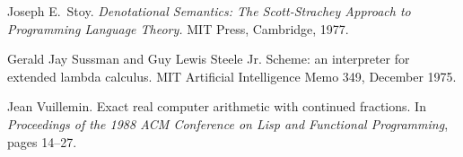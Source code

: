 \begin{thebibliography}{99}
Joseph E.~Stoy.
{\em Denotational Semantics: The Scott-Strachey Approach to
  Programming Language Theory.}
MIT Press, Cambridge, 1977.

Gerald Jay Sussman and Guy Lewis Steele Jr.
Scheme: an interpreter for extended lambda calculus.
MIT Artificial Intelligence Memo 349, December 1975.

Jean Vuillemin.
Exact real computer arithmetic with continued fractions.
In {\em Proceedings of the 1988 ACM Conference on Lisp and
  Functional Programming}, pages 14--27.

\end{thebibliography}
